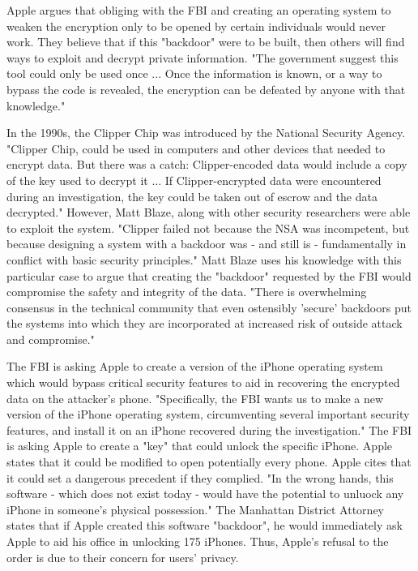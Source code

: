 Apple argues that obliging with the FBI and creating an operating system to weaken the encryption only to be opened by certain individuals would never work. They believe that if this "backdoor" were to be built, then others will find ways to exploit and decrypt private information. "The government suggest this tool could only be used once ... Once the information is known, or a way to bypass the code is revealed, the encryption can be defeated by anyone with that knowledge." \cite{appleletter}\par

In the 1990s, the Clipper Chip was introduced by the National Security Agency. "Clipper Chip, could be used in computers and other devices that needed to encrypt data. But there was a catch: Clipper-encoded data would include a copy of the key used to decrypt it ... If Clipper-encrypted data were encountered during an investigation, the key could be taken out of escrow and the data decrypted." \cite{washingtonBlaze} However, Matt Blaze, along with other security researchers were able to exploit the system. "Clipper failed not because the NSA was incompetent, but because designing a system with a backdoor was - and still is - fundamentally in conflict with basic security principles." \cite{washingtonBlaze} Matt Blaze uses his knowledge with this particular case to argue that creating the "backdoor" requested by the FBI would compromise the safety and integrity of the data. "There is overwhelming consensus in the technical community that even ostensibly 'secure' backdoors put the systems into which they are incorporated at increased risk of outside attack and compromise." \cite{washington-blaze}\par

The FBI is asking Apple to create a version of the iPhone operating system which would bypass critical security features to aid in recovering the encrypted data on the attacker's phone. "Specifically, the FBI wants us to make a new version of the iPhone operating system, circumventing several important security features, and install it on an iPhone recovered during the investigation."\cite{apple-letter} The FBI is asking Apple to create a "key" that could unlock the specific iPhone. Apple states that it could be modified to open potentially every phone. Apple cites that it could set a dangerous precedent if they complied. "In the wrong hands, this software - which does not exist today - would have the potential to unluock any iPhone in someone's physical possession." \cite{appleletter} The Manhattan District Attorney states that if Apple created this software "backdoor", he would immediately ask Apple to aid his office in unlocking 175 iPhones. Thus, Apple's refusal to the order is due to their concern for users' privacy.

